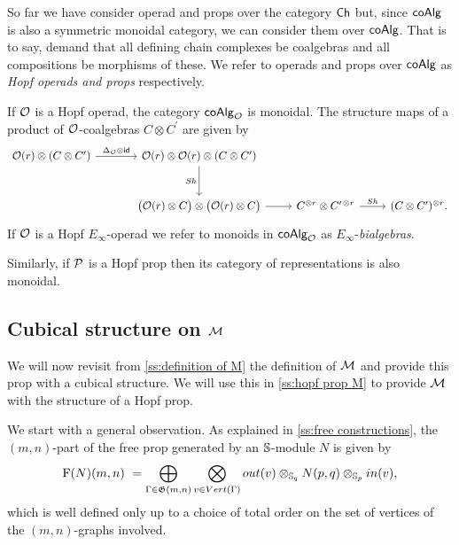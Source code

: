 So far we have consider operad and props over the category $\Ch$ but, since $\coAlg$ is also a symmetric monoidal category, we can consider them over $\coAlg$.
That is to say, demand that all defining chain complexes be coalgebras and all compositions be morphisms of these.
We refer to operads and props over $\coAlg$ as \textit{Hopf operads and props} respectively.

If $\cO$ is a Hopf operad, the category $\coAlg_\cO$ is monoidal.
The structure maps of a product of $\cO$-coalgebras $C \otimes C^\prime$ are given by
\[
\begin{tikzcd} [column sep = normal, row sep=large]
\cO(r) \otimes (C \otimes C^\prime) \arrow[r, "\Delta_\cO \otimes \id"] &[10 pt] \cO(r) \otimes \cO(r) \otimes (C \otimes C^\prime) \arrow[d, "Sh"'] & & \\ &
\big(\cO(r) \otimes C \big) \otimes \big( \cO(r) \otimes C \big) \arrow[r] &
C^{\otimes r} \otimes C^{\prime\, \otimes r} \arrow[r, "Sh"] &
(C \otimes C^\prime)^{\otimes r}.
\end{tikzcd}
\]
If $\cO$ is a Hopf $E_\infty$-operad we refer to monoids in $\coAlg_\cO$ as $E_\infty$-\textit{bialgebras}.

Similarly, if $\cP$ is a Hopf prop then its category of representations is also monoidal.

\subsection{Cubical structure on $\M$}

We will now revisit from \cref{ss:definition of M} the definition of $\M$ and provide this prop with a cubical structure.
We will use this in \cref{ss:hopf prop M} to provide $\M$ with the structure of a Hopf prop.

We start with a general observation.
As explained in \cref{ss:free constructions}, the $(m,n)$-part of the free prop generated by an $\S$-module $N$ is given by
\[
\free(N)(m,n) \ = \bigoplus_{\Gamma \in \graphs(m,n)} \bigotimes_{v \in Vert(\Gamma)} out(v) \otimes_{\S_q} N(p, q) \otimes_{\S_p} in(v),
\]
which is well defined only up to a choice of total order on the set of vertices of the $(m,n)$-graphs involved.

